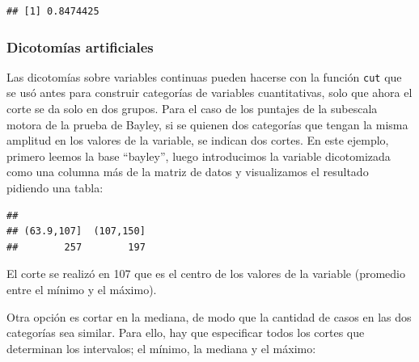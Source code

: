\documentclass[]{book}
\newenvironment{Shaded}{\begin{snugshade}}{\end{snugshade}}
\newcommand{\DataTypeTok}[1]{\textcolor[rgb]{0.13,0.29,0.53}{#1}}
\newcommand{\DecValTok}[1]{\textcolor[rgb]{0.00,0.00,0.81}{#1}}
\newcommand{\FloatTok}[1]{\textcolor[rgb]{0.00,0.00,0.81}{#1}}
\newcommand{\KeywordTok}[1]{\textcolor[rgb]{0.13,0.29,0.53}{\textbf{#1}}}
\newcommand{\NormalTok}[1]{#1}
\newcommand{\OperatorTok}[1]{\textcolor[rgb]{0.81,0.36,0.00}{\textbf{#1}}}
\newcommand{\StringTok}[1]{\textcolor[rgb]{0.31,0.60,0.02}{#1}}
\begin{document}
\begin{verbatim}
## [1] 0.8474425
\end{verbatim}

\hypertarget{dicotomuxedas-artificiales}{%
\subsubsection{Dicotomías artificiales}\label{dicotomuxedas-artificiales}}

Las dicotomías sobre variables continuas pueden hacerse con la función \texttt{cut} que se usó antes para construir categorías de variables cuantitativas, solo que ahora el corte se da solo en dos grupos. Para el caso de los puntajes de la subescala motora de la prueba de Bayley, si se quienen dos categorías que tengan la misma amplitud en los valores de la variable, se indican dos cortes. En este ejemplo, primero leemos la base ``bayley'', luego introducimos la variable dicotomizada como una columna más de la matriz de datos y visualizamos el resultado pidiendo una tabla:

\begin{Shaded}
\end{Shaded}

\begin{verbatim}
## 
## (63.9,107]  (107,150] 
##        257        197
\end{verbatim}

El corte se realizó en 107 que es el centro de los valores de la variable (promedio entre el mínimo y el máximo).

Otra opción es cortar en la mediana, de modo que la cantidad de casos en las dos categorías sea similar. Para ello, hay que especificar todos los cortes que determinan los intervalos; el mínimo, la mediana y el máximo:

\begin{Shaded}
\end{Shaded}
\end{document}

